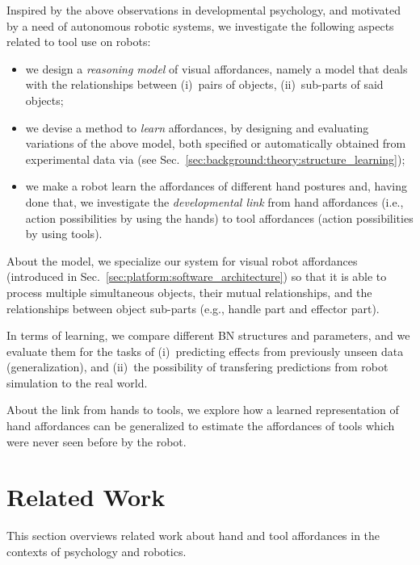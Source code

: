 Inspired by the above observations in developmental psychology, and motivated by a need of autonomous robotic systems, we investigate the following aspects related to tool use on robots:
\begin{itemize}
\item we design a \emph{reasoning model} of visual \intobj{} affordances, namely a model that deals with the relationships between (i)~pairs of objects, (ii)~sub-parts of said objects;

\item we devise a method to \emph{learn} \intobj{} affordances, by designing and evaluating variations of the above model, both specified \apriori{} or automatically obtained from experimental data via \StructureLearning{} (see Sec.~\ref{sec:background:theory:structure_learning});

\item we make a robot learn the affordances of different hand postures and, having done that, we investigate the \emph{developmental link} from hand affordances (i.e., action possibilities by using the hands) to tool affordances (action possibilities by using tools).
\end{itemize}

About the model, we specialize our system for visual robot affordances (introduced in Sec.~\ref{sec:platform:software_architecture}) so that it is able to process multiple simultaneous objects, their mutual relationships, and the relationships between object sub-parts (e.g., handle part and effector part).

In terms of learning, we compare different \ac{BN} structures and parameters, and we evaluate them for the tasks of
(i)~predicting effects from previously unseen data (generalization), and
(ii)~the possibility of transfering predictions from robot simulation to the real world.

About the link from hands to tools, we explore how a learned representation of hand affordances can be generalized to estimate the affordances of tools
which were never seen before by the robot.

\section{Related Work}
\label{sec:tool:related_work}

This section overviews related work about hand and tool affordances in the contexts of psychology and robotics.

